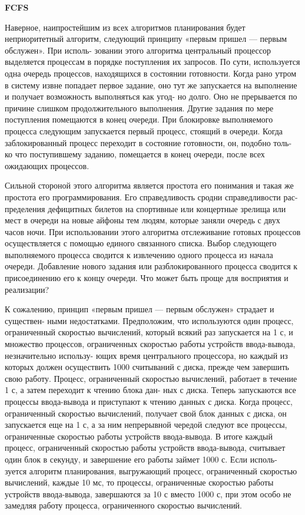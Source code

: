 \textbf{FCFS}

Наверное, наипростейшим из всех алгоритмов планирования будет неприоритетный
алгоритм, следующий принципу «первым пришел — первым обслужен». При исполь-
зовании этого алгоритма центральный процессор выделяется процессам в порядке
поступления их запросов. По сути, используется одна очередь процессов, находящихся
в состоянии готовности. Когда рано утром в систему извне попадает первое задание,
оно тут же запускается на выполнение и получает возможность выполняться как угод-
но долго. Оно не прерывается по причине слишком продолжительного выполнения.
Другие задания по мере поступления помещаются в конец очереди. При блокировке
выполняемого процесса следующим запускается первый процесс, стоящий в очереди.
Когда заблокированный процесс переходит в состояние готовности, он, подобно толь-
ко что поступившему заданию, помещается в конец очереди, после всех ожидающих
процессов.

Сильной стороной этого алгоритма является простота его понимания и такая же
простота его программирования. Его справедливость сродни справедливости рас-
пределения дефицитных билетов на спортивные или концертные зрелища или мест
в очереди на новые айфоны тем людям, которые заняли очередь с двух часов ночи.
При использовании этого алгоритма отслеживание готовых процессов осуществляется
с помощью единого связанного списка. Выбор следующего выполняемого процесса
сводится к извлечению одного процесса из начала очереди. Добавление нового задания
или разблокированного процесса сводится к присоединению его к концу очереди. Что
может быть проще для восприятия и реализации?

К сожалению, принцип «первым пришел — первым обслужен» страдает и существен-
ными недостатками. Предположим, что используются один процесс, ограниченный
скоростью вычислений, который всякий раз запускается на 1 с, и множество процессов,
ограниченных скоростью работы устройств ввода-вывода, незначительно использу-
ющих время центрального процессора, но каждый из которых должен осуществить
1000 считываний с диска, прежде чем завершить свою работу. Процесс, ограниченный
скоростью вычислений, работает в течение 1 с, а затем переходит к чтению блока дан-
ных с диска. Теперь запускаются все процессы ввода-вывода и приступают к чтению
данных с диска. Когда процесс, ограниченный скоростью вычислений, получает свой
блок данных с диска, он запускается еще на 1 с, а за ним непрерывной чередой следуют
все процессы, ограниченные скоростью работы устройств ввода-вывода.
В итоге каждый процесс, ограниченный скоростью работы устройств ввода-вывода,
считывает один блок в секунду, и завершение его работы займет 1000 с. Если исполь-
зуется алгоритм планирования, выгружающий процесс, ограниченный скоростью
вычислений, каждые 10 мс, то процессы, ограниченные скоростью работы устройств
ввода-вывода, завершаются за 10 с вместо 1000 с, при этом особо не замедляя работу
процесса, ограниченного скоростью вычислений.
\newline

